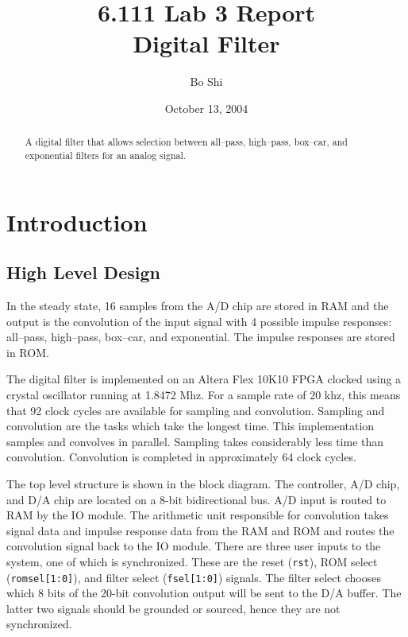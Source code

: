 \documentclass[12pt]{article}
\author{Bo Shi}
\title{6.111 Lab 3 Report \\ Digital Filter}
\date{October 13, 2004}
\begin{document}
\maketitle

\begin{abstract}
A digital filter that allows selection between all--pass, high--pass, box--car,
and exponential filters for an analog signal.
\end{abstract}

\newpage
\section{Introduction}
	\subsection{High Level Design}
	In the steady state, 16 samples from the A/D chip are stored in RAM and
	the output is the convolution of the input signal with 4 possible impulse
	responses: all--pass, high--pass, box--car, and exponential.  The impulse
	responses are stored in ROM.

	The digital filter is implemented on an Altera Flex 10K10 FPGA clocked
	using a crystal oscillator running at 1.8472 Mhz.  For a sample rate of
	20 khz, this means that 92 clock cycles are available for sampling and
	convolution.  Sampling and convolution are the tasks which take the
	longest time.  This implementation samples and convolves in parallel.
	Sampling takes considerably less time than convolution.  Convolution is
	completed in approximately 64 clock cycles.

	The top level structure is shown in the block diagram.  The controller,
	A/D chip, and D/A chip are located on a 8-bit bidirectional bus.  A/D
	input is routed to RAM by the IO module.  The arithmetic unit responsible
	for convolution takes signal data and impulse response data from the RAM
	and ROM and routes the convolution signal back to the IO module.  There
	are three user inputs to the system, one of which is synchronized.  These
	are the reset (\texttt{rst}), ROM select (\texttt{romsel[1:0]}), and filter
	select (\texttt{fsel[1:0]}) signals.  The filter select chooses which 8
	bits of the 20-bit convolution output will be sent to the D/A buffer.  The
	latter two signals should be grounded or sourced, hence they are not
	synchronized.

	
\end{document}
